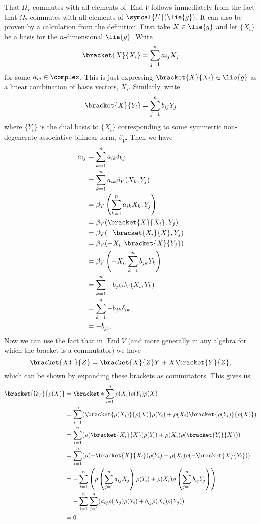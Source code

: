 \documentclass[fleqn]{NotesClass}
\DeclareMathOperator{\End}{End}
\newcommand{\universalenveloping}{\symcal{U}}
\begin{document}
    That \(\Omega_V\) commutes with all elements of \(\End V\) follows immediately from the fact that \(\Omega_2\) commutes with all elements of \(\universalenveloping(\lie{g})\).
    It can also be proven by a calculation from the definition.
    First take \(X \in \lie{g}\) and let \(\{X_i\}\) be a basis for the \(n\)-dimensional \(\lie{g}\).
    Write
    \begin{equation}
        \bracket{X}{X_i} = \sum_{j=1}^n a_{ij}X_j
    \end{equation}
    for some \(a_{ij} \in \complex\).
    This is just expressing \(\bracket{X}{X_i} \in \lie{g}\) as a linear combination of basis vectors, \(X_i\).
    Similarly, write
    \begin{equation}
        \bracket{X}{Y_i} = \sum_{j=1}^n b_{ij}Y_j
    \end{equation}
    where \(\{Y_i\}\) is the dual basis to \(\{X_i\}\) corresponding to some symmetric non-degenerate associative bilinear form, \(\beta_V\).
    Then we have
    \begin{align}
        a_{ij} &= \sum_{k=1}^n a_{ik} \delta_{kj}\\
        &= \sum_{k=1}^n a_{ik} \beta_V(X_k, Y_j)\\
        &= \beta_V\left( \sum_{k=1}^n a_{ik}X_k, Y_j \right)\\
        &= \beta_V(\bracket{X}{X_i}, Y_j)\\
        &= \beta_V(-\bracket{X_i}{X}, Y_j)\\
        &= \beta_V(-X_i, \bracket{X}{Y_j})\\
        &= \beta_V\left( -X_i, \sum_{k=1}^n b_{jk}Y_k \right)\\
        &= \sum_{k=1}^n -b_{jk} \beta_V(X_i, Y_k)\\
        &= \sum_{k=1}^n -b_{jk} \delta_{ik}\\
        &= -b_{ji}.
    \end{align}
    Now we can use the fact that in \(\End V\) (and more generally in any algebra for which the bracket is a commutator) we have
    \begin{equation}
        \bracket{XY}{Z} = \bracket{X}{Z}Y + X\bracket{Y}{Z},
    \end{equation}
    which can be shown by expanding these brackets as commutators.
    This gives us
    \begin{align}
        \bracket{\Omega_V}{\rho(X)} &= \bracket*{\sum_{i=1}^n \rho(X_i)\rho(Y_i)}{\rho(X)}\\
        &= \sum_{i=1}^n (\bracket{\rho(X_i)}{\rho(X)}\rho(Y_i) + \rho(X_i)\bracket{\rho(Y_i)}{\rho(X)})\\
        &= \sum_{i=1}^n (\rho(\bracket{X_i}{X}) \rho(Y_i) + \rho(X_i) \rho(\bracket{Y_i}{X}))\\
        &= \sum_{i=1}^n (\rho(-\bracket{X}{X_i}) \rho(Y_i) + \rho(X_i) \rho(-\bracket{X}{Y_i}))\\
        &= -\sum_{i=1}^n \left( \rho\left( \sum_{j=1}^n a_{ij}X_j \right) \rho(Y_i) + \rho(X_i) \rho\left( \sum_{j=1}^n b_{ij}Y_j \right) \right)\\
        &= -\sum_{i=1}^n \sum_{j=1}^n (a_{ij}\rho(X_j)\rho(Y_i) + b_{ij}\rho(X_i)\rho(Y_j))\\
        &= 0
    \end{align}
\end{document}
